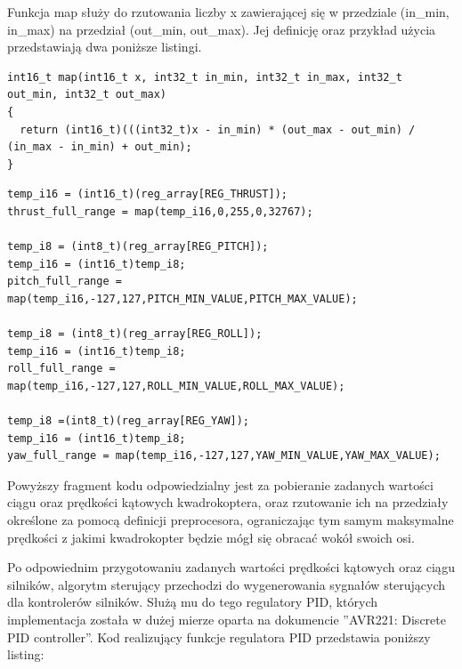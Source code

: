 Funkcja map służy do rzutowania liczby x zawierającej się w przedziale (in\_min, in\_max) na przedział (out\_min, out\_max). Jej definicję oraz przykład użycia przedstawiają dwa poniższe listingi.

\begin{lstlisting}
int16_t map(int16_t x, int32_t in_min, int32_t in_max, int32_t out_min, int32_t out_max)
{
  return (int16_t)(((int32_t)x - in_min) * (out_max - out_min) / (in_max - in_min) + out_min);
}
\end{lstlisting}



\begin{lstlisting}
temp_i16 = (int16_t)(reg_array[REG_THRUST]);
thrust_full_range = map(temp_i16,0,255,0,32767);

temp_i8 = (int8_t)(reg_array[REG_PITCH]);
temp_i16 = (int16_t)temp_i8;
pitch_full_range = map(temp_i16,-127,127,PITCH_MIN_VALUE,PITCH_MAX_VALUE);

temp_i8 = (int8_t)(reg_array[REG_ROLL]);
temp_i16 = (int16_t)temp_i8;
roll_full_range = map(temp_i16,-127,127,ROLL_MIN_VALUE,ROLL_MAX_VALUE);

temp_i8 =(int8_t)(reg_array[REG_YAW]);
temp_i16 = (int16_t)temp_i8;
yaw_full_range = map(temp_i16,-127,127,YAW_MIN_VALUE,YAW_MAX_VALUE);
\end{lstlisting}

Powyższy fragment kodu odpowiedzialny jest za pobieranie zadanych wartości ciągu oraz prędkości kątowych kwadrokoptera, oraz rzutowanie ich na przedziały określone za pomocą definicji preprocesora, ograniczając tym samym maksymalne prędkości z jakimi kwadrokopter będzie mógł się obracać wokół swoich osi.

Po odpowiednim przygotowaniu zadanych wartości prędkości kątowych oraz ciągu silników, algorytm sterujący przechodzi do wygenerowania sygnałów sterujących dla kontrolerów silników. Służą mu do tego regulatory PID, których implementacja została w dużej mierze oparta na dokumencie ''AVR221: Discrete PID controller''. Kod realizujący funkcje regulatora PID przedstawia poniższy listing:


